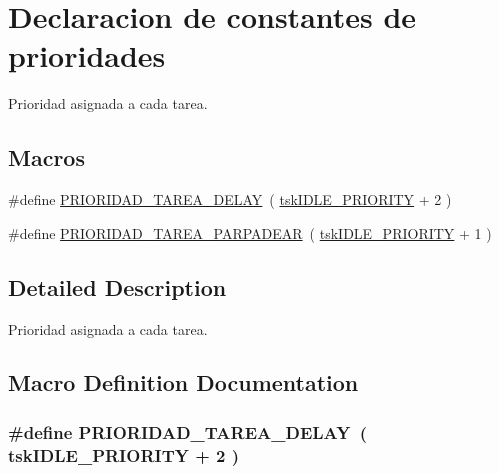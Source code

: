 \hypertarget{group___p_r_i_o_r_i_d_a_d_t_a_r_e_a_s}{}\section{Declaracion de constantes de prioridades}
\label{group___p_r_i_o_r_i_d_a_d_t_a_r_e_a_s}


Prioridad asignada a cada tarea.  


\subsection*{Macros}
\begin{DoxyCompactItemize}
\item 
\#define \hyperlink{group___p_r_i_o_r_i_d_a_d_t_a_r_e_a_s_gaeb7652a6bef59d6b2b760ed0258a13b3}{P\+R\+I\+O\+R\+I\+D\+A\+D\+\_\+\+T\+A\+R\+E\+A\+\_\+\+D\+E\+L\+AY}~( \hyperlink{task_8h_a94ed0b9b3b4e8ccc859c322f18583e67}{tsk\+I\+D\+L\+E\+\_\+\+P\+R\+I\+O\+R\+I\+TY} + 2 )
\item 
\#define \hyperlink{group___p_r_i_o_r_i_d_a_d_t_a_r_e_a_s_gad37dbb83921f102e5d414ee65e79c4fe}{P\+R\+I\+O\+R\+I\+D\+A\+D\+\_\+\+T\+A\+R\+E\+A\+\_\+\+P\+A\+R\+P\+A\+D\+E\+AR}~( \hyperlink{task_8h_a94ed0b9b3b4e8ccc859c322f18583e67}{tsk\+I\+D\+L\+E\+\_\+\+P\+R\+I\+O\+R\+I\+TY} + 1 )
\end{DoxyCompactItemize}


\subsection{Detailed Description}
Prioridad asignada a cada tarea. 



\subsection{Macro Definition Documentation}
\subsubsection[{\texorpdfstring{P\+R\+I\+O\+R\+I\+D\+A\+D\+\_\+\+T\+A\+R\+E\+A\+\_\+\+D\+E\+L\+AY}{PRIORIDAD_TAREA_DELAY}}]{\setlength{\rightskip}{0pt plus 5cm}\#define P\+R\+I\+O\+R\+I\+D\+A\+D\+\_\+\+T\+A\+R\+E\+A\+\_\+\+D\+E\+L\+AY~( {\bf tsk\+I\+D\+L\+E\+\_\+\+P\+R\+I\+O\+R\+I\+TY} + 2 )}\hypertarget{group___p_r_i_o_r_i_d_a_d_t_a_r_e_a_s_gaeb7652a6bef59d6b2b760ed0258a13b3}{}\label{group___p_r_i_o_r_i_d_a_d_t_a_r_e_a_s_gaeb7652a6bef59d6b2b760ed0258a13b3}


